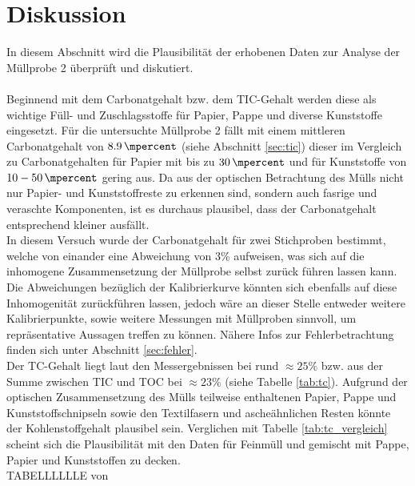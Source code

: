 \chapter{Diskussion}
\label{sec:diskussion}

In diesem Abschnitt wird die Plausibilität der erhobenen Daten zur Analyse der Müllprobe 2 überprüft und diskutiert.\\ \\
Beginnend mit dem Carbonatgehalt bzw. dem TIC-Gehalt werden diese als wichtige Füll- und Zuschlagsstoffe für Papier, Pappe und diverse Kunststoffe eingesetzt. Für die untersuchte Müllprobe 2 fällt mit einem mittleren Carbonatgehalt von $\SI{8.9}{\mpercent}$ (siehe Abschnitt \ref{sec:tic}) dieser im Vergleich zu Carbonatgehalten für Papier mit bis zu $\SI{30}{\mpercent}$ \cite{Wikipedia.21.11.2019} und für Kunststoffe von $10 - \SI{50}{\mpercent}$ \cite{PolymerServiceGmbHMerseburg.13.08.2019} gering aus. Da aus der optischen Betrachtung des Mülls nicht nur Papier- und Kunststoffreste zu erkennen sind, sondern auch fasrige und veraschte Komponenten, ist es durchaus plausibel, dass der Carbonatgehalt entsprechend kleiner ausfällt. \\
In diesem Versuch wurde der Carbonatgehalt für zwei Stichproben bestimmt, welche von einander eine Abweichung von 3\% aufweisen, was sich auf die inhomogene Zusammensetzung der Müllprobe selbst zurück führen lassen kann.\linebreak
Die Abweichungen bezüglich der Kalibrierkurve könnten sich ebenfalls auf diese Inhomogenität zurückführen lassen, jedoch wäre an dieser Stelle entweder weitere Kalibrierpunkte, sowie weitere Messungen mit Müllproben sinnvoll, um repräsentative Aussagen treffen zu können. Nähere Infos zur Fehlerbetrachtung finden sich unter Abschnitt \ref{sec:fehler}.\\

Der TC-Gehalt liegt laut den Messergebnissen bei rund $\approx 25\%$ bzw. aus der Summe zwischen TIC und TOC bei  $\approx 23\%$ (siehe Tabelle \ref{tab:tc}). Aufgrund der optischen Zusammensetzung des Mülls teilweise enthaltenen Papier, Pappe und Kunststoffschnipseln sowie den Textilfasern und ascheähnlichen Resten könnte der Kohlenstoffgehalt plausibel sein. Verglichen mit Tabelle \ref{tab:tc_vergleich} \cite[S.13]{HansGunterRamke.} scheint sich die Plausibilität mit den Daten für Feinmüll und gemischt mit Pappe, Papier und Kunststoffen zu decken.\\

TABELLLLLLE von \cite{HansGunterRamke.}

